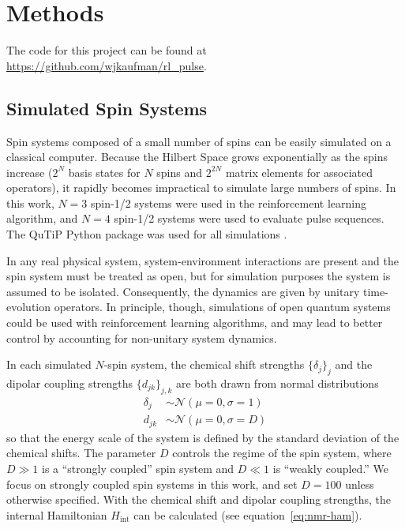 
\chapter{Methods} %



The code for this project can be found at \url{https://github.com/wjkaufman/rl_pulse}.

\section{Simulated Spin Systems}

Spin systems composed of a small number of spins can be easily simulated on a classical computer. Because the Hilbert Space grows exponentially as the spins increase ($2^N$ basis states for $N$ spins and $2^{2N}$ matrix elements for associated operators), it rapidly becomes impractical to simulate large numbers of spins. In this work, $N=3$ spin-1/2 systems were used in the reinforcement learning algorithm, and $N=4$ spin-1/2 systems were used to evaluate pulse sequences. The QuTiP Python package was used for all simulations \cite{Johansson_2013}.

In any real physical system, system-environment interactions are present and the spin system must be treated as open, but for simulation purposes the system is assumed to be isolated. %
Consequently, the dynamics are given by unitary time-evolution operators. In principle, though, simulations of open quantum systems could be used with reinforcement learning algorithms, and may lead to better control by accounting for non-unitary system dynamics.

In each simulated $N$-spin system, the chemical shift strengths $\{\delta_j\}_j$ and the dipolar coupling strengths $\{d_{jk}\}_{j,k}$ are both drawn from normal distributions
\begin{align*}
    \delta_j &\sim \mathcal{N}(\mu=0, \sigma=1) \\
    d_{jk} &\sim \mathcal{N}(\mu=0, \sigma=D)
\end{align*}
so that the energy scale of the system is defined by the standard deviation of the chemical shifts. The parameter $D$ controls the regime of the spin system, where $D \gg 1$ is a ``strongly coupled'' spin system and $D \ll 1$ is ``weakly coupled.'' We focus on strongly coupled spin systems in this work, and set $D = 100$ unless otherwise specified. With the chemical shift and dipolar coupling strengths, the internal Hamiltonian $H_{\text{int}}$ can be calculated (see equation~\ref{eq:nmr-ham}).

